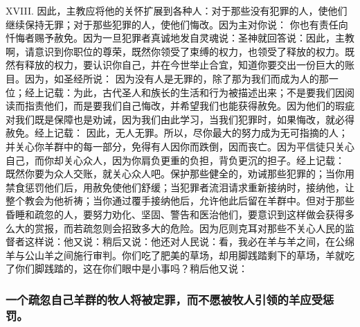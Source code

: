XVIII. 因此，主教应将他的关怀扩展到各种人：对于那些没有犯罪的人，使他们继续保持无罪；对于那些犯罪的人，使他们悔改。因为主对你说： 你也有责任向忏悔者赐予赦免。因为一旦犯罪者真诚地发自灵魂说：圣神就回答说：因此，主教啊，请意识到你职位的尊荣，既然你领受了束缚的权力，也领受了释放的权力。既然有释放的权力，要认识你自己，并在今世举止合宜，知道你要交出一份巨大的账目。因为，如圣经所说： 因为没有人是无罪的，除了那为我们而成为人的那一位；经上记载：为此，古代圣人和族长的生活和行为被描述出来；不是要我们因阅读而指责他们，而是要我们自己悔改，并希望我们也能获得赦免。因为他们的瑕疵对我们既是保障也是劝诫，因为我们由此学习，当我们犯罪时，如果悔改，就必得赦免。经上记载： 因此，无人无罪。所以，尽你最大的努力成为无可指摘的人；并关心你羊群中的每一部分，免得有人因你而跌倒，因而丧亡。因为平信徒只关心自己，而你却关心众人，因为你肩负更重的负担，背负更沉的担子。经上记载： 既然你要为众人交账，就关心众人吧。保护那些健全的，劝诫那些犯罪的；当你用禁食惩罚他们后，用赦免使他们舒缓；当犯罪者流泪请求重新接纳时，接纳他，让整个教会为他祈祷；当你通过覆手接纳他后，允许他此后留在羊群中。但对于那些昏睡和疏忽的人，要努力劝化、坚固、警告和医治他们，要意识到这样做会获得多么大的赏报，而若疏忽则会招致多大的危险。因为厄则克耳对那些不关心人民的监督者这样说：他又说：稍后又说：他还对人民说：看，我必在羊与羊之间，在公绵羊与公山羊之间施行审判。你们吃了肥美的草场，却用脚践踏剩下的草场，羊就吃了你们脚践踏的，这在你们眼中是小事吗？稍后他又说：\par


\subsubsection{一个疏忽自己羊群的牧人将被定罪，而不愿被牧人引领的羊应受惩罚。}

